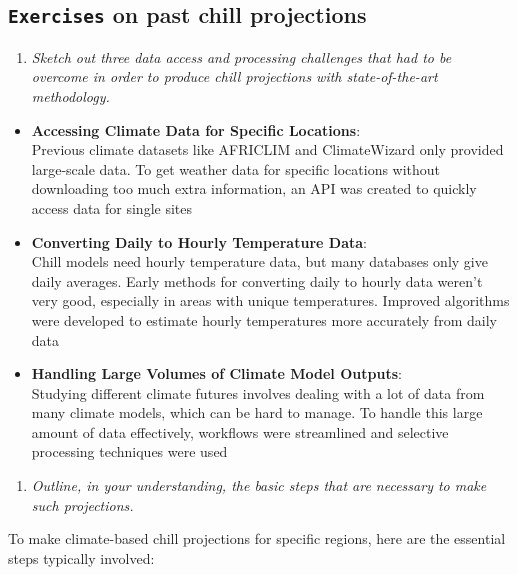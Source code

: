 \documentclass[
]{article}
\providecommand{\tightlist}{%
  \setlength{\itemsep}{0pt}\setlength{\parskip}{0pt}}
\begin{document}
\subsection{\texorpdfstring{\texttt{Exercises} on past chill projections}{Exercises on past chill projections}}\label{exercises-on-past-chill-projections}

\begin{enumerate}
\def\labelenumi{\arabic{enumi}.}
\tightlist
\item
  \emph{Sketch out three data access and processing challenges that had to be overcome in order to produce chill projections with state-of-the-art methodology.}
\end{enumerate}

\begin{itemize}
\item
  \textbf{Accessing Climate Data for Specific Locations}:\\
  Previous climate datasets like AFRICLIM and ClimateWizard only provided large-scale data. To get weather data for specific locations without downloading too much extra information, an API was created to quickly access data for single sites
\item
  \textbf{Converting Daily to Hourly Temperature Data}:\\
  Chill models need hourly temperature data, but many databases only give daily averages. Early methods for converting daily to hourly data weren't very good, especially in areas with unique temperatures. Improved algorithms were developed to estimate hourly temperatures more accurately from daily data
\item
  \textbf{Handling Large Volumes of Climate Model Outputs}:\\
  Studying different climate futures involves dealing with a lot of data from many climate models, which can be hard to manage. To handle this large amount of data effectively, workflows were streamlined and selective processing techniques were used
\end{itemize}

\begin{enumerate}
\def\labelenumi{\arabic{enumi}.}
\setcounter{enumi}{1}
\tightlist
\item
  \emph{Outline, in your understanding, the basic steps that are necessary to make such projections.}
\end{enumerate}

To make climate-based chill projections for specific regions, here are the essential steps typically involved:
\end{document}
